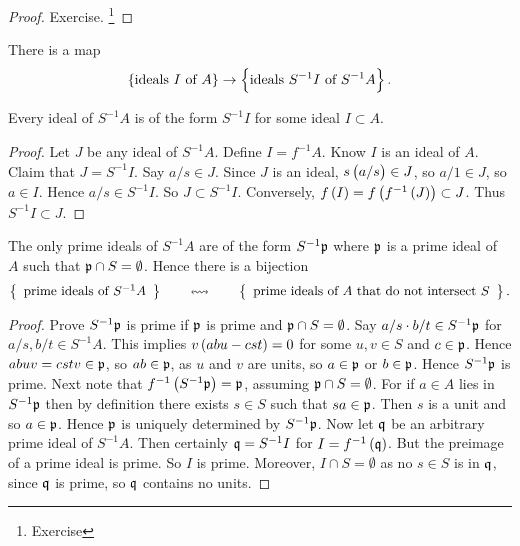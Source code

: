 \begin{proof}
Exercise. \footnote{Exercise}
\end{proof}

There is a map
$$ \cbr{\text{ideals} \ I \ \text{of} \ A} \to \cbr{\text{ideals} \ S^{-1}I \ \text{of} \ S^{-1}A}. $$

\begin{proposition}
Every ideal of $ S^{-1}A $ is of the form $ S^{-1}I $ for some ideal $ I \subset A $.
\end{proposition}

\begin{proof}
Let $ J $ be any ideal of $ S^{-1}A $. Define $ I = f^{-1}A $. Know $ I $ is an ideal of $ A $. Claim that $ J = S^{-1}I $. Say $ a / s \in J $. Since $ J $ is an ideal, $ s\br{a / s} \in J $, so $ a / 1 \in J $, so $ a \in I $. Hence $ a / s \in S^{-1}I $. So $ J \subset S^{-1}I $. Conversely, $ f\br{I} = f\br{f^{-1}\br{J}} \subset J $. Thus $ S^{-1}I \subset J $.
\end{proof}

\begin{theorem}
\label{thm:6.9}
The only prime ideals of $ S^{-1}A $ are of the form $ S^{-1}\mathfrak{p} $ where $ \mathfrak{p} $ is a prime ideal of $ A $ such that $ \mathfrak{p} \cap S = \emptyset $. Hence there is a bijection
$$ \correspondence{\text{prime ideals of} \ S^{-1}A}{\text{prime ideals of} \ A \ \text{that do not intersect} \ S}. $$
\end{theorem}

\begin{proof}
Prove $ S^{-1}\mathfrak{p} $ is prime if $ \mathfrak{p} $ is prime and $ \mathfrak{p} \cap S = \emptyset $. Say $ a / s \cdot b / t \in S^{-1}\mathfrak{p} $ for $ a / s, b / t \in S^{-1}A $. This implies $ v\br{abu - cst} = 0 $ for some $ u, v \in S $ and $ c \in \mathfrak{p} $. Hence $ abuv = cstv \in \mathfrak{p} $, so $ ab \in \mathfrak{p} $, as $ u $ and $ v $ are units, so $ a \in \mathfrak{p} $ or $ b \in \mathfrak{p} $. Hence $ S^{-1}\mathfrak{p} $ is prime. Next note that $ f^{-1}\br{S^{-1}\ppp} = \ppp $, assuming $ \mathfrak{p} \cap S = \emptyset $. For if $ a \in A $ lies in $ S^{-1}\mathfrak{p} $ then by definition there exists $ s \in S $ such that $ sa \in \mathfrak{p} $. Then $ s $ is a unit and so $ a \in \mathfrak{p} $. Hence $ \mathfrak{p} $ is uniquely determined by $ S^{-1}\mathfrak{p} $. Now let $ \mathfrak{q} $ be an arbitrary prime ideal of $ S^{-1}A $. Then certainly $ \mathfrak{q} = S^{-1}I $ for $ I = f^{-1}\br{\qqq} $. But the preimage of a prime ideal is prime. So $ I $ is prime. Moreover, $ I \cap S = \emptyset $ as no $ s \in S $ is in $ \mathfrak{q} $, since $ \mathfrak{q} $ is prime, so $ \mathfrak{q} $ contains no units.
\end{proof}

